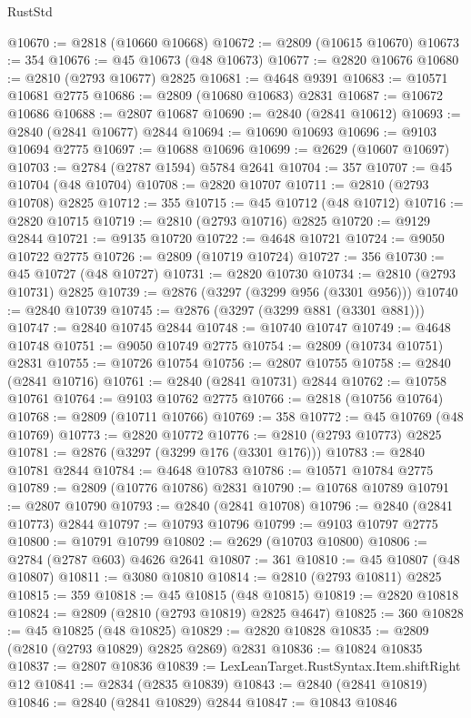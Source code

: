 \begin{lexlean}{RustStd}
\begin{coremodule}
{\begin{coremodule}
{{{{{{{{{{{{{{{{{{{{{{{{{{{{{{{{{@10670 := @2818 (@10660 @10668)
@10672 := @2809 (@10615 @10670)
@10673 := 354
@10676 := @45 @10673 (@48 @10673)
@10677 := @2820 @10676
@10680 := @2810 (@2793 @10677) @2825
@10681 := @4648 @9391
@10683 := @10571 @10681 @2775
@10686 := @2809 (@10680 @10683) @2831
@10687 := @10672 @10686
@10688 := @2807 @10687
@10690 := @2840 (@2841 @10612)
@10693 := @2840 (@2841 @10677) @2844
@10694 := @10690 @10693
@10696 := @9103 @10694 @2775
@10697 := @10688 @10696
@10699 := @2629 (@10607 @10697)
@10703 := @2784 (@2787 @1594) @5784 @2641
@10704 := 357
@10707 := @45 @10704 (@48 @10704)
@10708 := @2820 @10707
@10711 := @2810 (@2793 @10708) @2825
@10712 := 355
@10715 := @45 @10712 (@48 @10712)
@10716 := @2820 @10715
@10719 := @2810 (@2793 @10716) @2825
@10720 := @9129 @2844
@10721 := @9135 @10720
@10722 := @4648 @10721
@10724 := @9050 @10722 @2775
@10726 := @2809 (@10719 @10724)
@10727 := 356
@10730 := @45 @10727 (@48 @10727)
@10731 := @2820 @10730
@10734 := @2810 (@2793 @10731) @2825
@10739 := @2876 (@3297 (@3299 @956 (@3301 @956)))
@10740 := @2840 @10739
@10745 := @2876 (@3297 (@3299 @881 (@3301 @881)))
@10747 := @2840 @10745 @2844
@10748 := @10740 @10747
@10749 := @4648 @10748
@10751 := @9050 @10749 @2775
@10754 := @2809 (@10734 @10751) @2831
@10755 := @10726 @10754
@10756 := @2807 @10755
@10758 := @2840 (@2841 @10716)
@10761 := @2840 (@2841 @10731) @2844
@10762 := @10758 @10761
@10764 := @9103 @10762 @2775
@10766 := @2818 (@10756 @10764)
@10768 := @2809 (@10711 @10766)
@10769 := 358
@10772 := @45 @10769 (@48 @10769)
@10773 := @2820 @10772
@10776 := @2810 (@2793 @10773) @2825
@10781 := @2876 (@3297 (@3299 @176 (@3301 @176)))
@10783 := @2840 @10781 @2844
@10784 := @4648 @10783
@10786 := @10571 @10784 @2775
@10789 := @2809 (@10776 @10786) @2831
@10790 := @10768 @10789
@10791 := @2807 @10790
@10793 := @2840 (@2841 @10708)
@10796 := @2840 (@2841 @10773) @2844
@10797 := @10793 @10796
@10799 := @9103 @10797 @2775
@10800 := @10791 @10799
@10802 := @2629 (@10703 @10800)
@10806 := @2784 (@2787 @603) @4626 @2641
@10807 := 361
@10810 := @45 @10807 (@48 @10807)
@10811 := @3080 @10810
@10814 := @2810 (@2793 @10811) @2825
@10815 := 359
@10818 := @45 @10815 (@48 @10815)
@10819 := @2820 @10818
@10824 := @2809 (@2810 (@2793 @10819) @2825 @4647)
@10825 := 360
@10828 := @45 @10825 (@48 @10825)
@10829 := @2820 @10828
@10835 := @2809 (@2810 (@2793 @10829) @2825 @2869) @2831
@10836 := @10824 @10835
@10837 := @2807 @10836
@10839 := LexLeanTarget.RustSyntax.Item.shiftRight @12
@10841 := @2834 (@2835 @10839)
@10843 := @2840 (@2841 @10819)
@10846 := @2840 (@2841 @10829) @2844
@10847 := @10843 @10846
}}}}}}}}}}}}}}}}}}}}}}}}}}}}}}}}}
\end{coremodule}}
\end{coremodule}
\end{lexlean}
